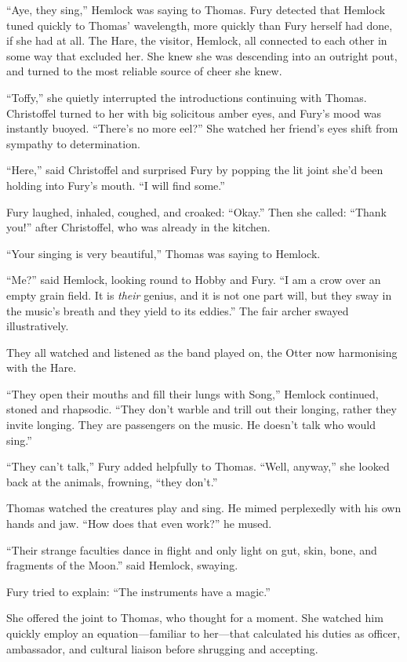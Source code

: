 \documentclass[11pt,a5paper]{article}
\begin{document}
``Aye, they sing,'' Hemlock was saying to Thomas. Fury detected that Hemlock tuned quickly to Thomas' wavelength, more quickly than Fury herself had done, if she had at all. The Hare, the visitor, Hemlock, all connected to each other in some way that excluded her. She knew she was descending into an outright pout, and turned to the most reliable source of cheer she knew.

``Toffy,'' she quietly interrupted the introductions continuing with Thomas. Christoffel turned to her with big solicitous amber eyes, and Fury's mood was instantly buoyed. ``There's no more eel?'' She watched her friend's eyes shift from sympathy to determination.

``Here,'' said Christoffel and surprised Fury by popping the lit joint she'd been holding into Fury's mouth. ``I will find some.''

Fury laughed, inhaled, coughed, and croaked: ``Okay.'' Then she called: ``Thank you!'' after Christoffel, who was already in the kitchen.

``Your singing is very beautiful,'' Thomas was saying to Hemlock.

``Me?'' said Hemlock, looking round to Hobby and Fury. ``I am a crow over an empty grain field. It is \emph{their} genius, and it is not one part will, but they sway in the music's breath and they yield to its eddies.'' The fair archer swayed illustratively.

They all watched and listened as the band played on, the Otter now harmonising with the Hare.

``They open their mouths and fill their lungs with Song,'' Hemlock continued, stoned and rhapsodic. ``They don't warble and trill out their longing, rather they invite longing. They are passengers on the music. He doesn't talk who would sing.''

``They can't talk,'' Fury added helpfully to Thomas. ``Well, anyway,'' she looked back at the animals, frowning, ``they don't.''

Thomas watched the creatures play and sing. He mimed perplexedly with his own hands and jaw. ``How does that even work?'' he mused.

``Their strange faculties dance in flight and only light on gut, skin, bone, and fragments of the Moon.'' said Hemlock, swaying.

Fury tried to explain: ``The instruments have a magic.''

She offered the joint to Thomas, who thought for a moment. She watched him quickly employ an equation---familiar to her---that calculated his duties as officer, ambassador, and cultural liaison before shrugging and accepting.
\end{document}
